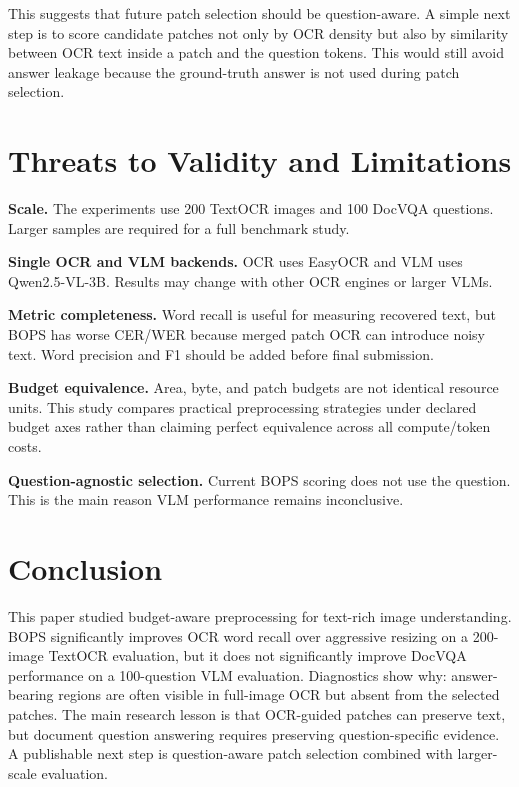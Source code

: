 \documentclass[conference]{IEEEtran}
\begin{document}
This suggests that future patch selection should be question-aware. A simple next step is to score candidate patches not only by OCR density but also by similarity between OCR text inside a patch and the question tokens. This would still avoid answer leakage because the ground-truth answer is not used during patch selection.

\section{Threats to Validity and Limitations}
\textbf{Scale.} The experiments use 200 TextOCR images and 100 DocVQA questions. Larger samples are required for a full benchmark study.

\textbf{Single OCR and VLM backends.} OCR uses EasyOCR and VLM uses Qwen2.5-VL-3B. Results may change with other OCR engines or larger VLMs.

\textbf{Metric completeness.} Word recall is useful for measuring recovered text, but BOPS has worse CER/WER because merged patch OCR can introduce noisy text. Word precision and F1 should be added before final submission.

\textbf{Budget equivalence.} Area, byte, and patch budgets are not identical resource units. This study compares practical preprocessing strategies under declared budget axes rather than claiming perfect equivalence across all compute/token costs.

\textbf{Question-agnostic selection.} Current BOPS scoring does not use the question. This is the main reason VLM performance remains inconclusive.

\section{Conclusion}
This paper studied budget-aware preprocessing for text-rich image understanding. BOPS significantly improves OCR word recall over aggressive resizing on a 200-image TextOCR evaluation, but it does not significantly improve DocVQA performance on a 100-question VLM evaluation. Diagnostics show why: answer-bearing regions are often visible in full-image OCR but absent from the selected patches. The main research lesson is that OCR-guided patches can preserve text, but document question answering requires preserving question-specific evidence. A publishable next step is question-aware patch selection combined with larger-scale evaluation.

\balance
\end{document}

